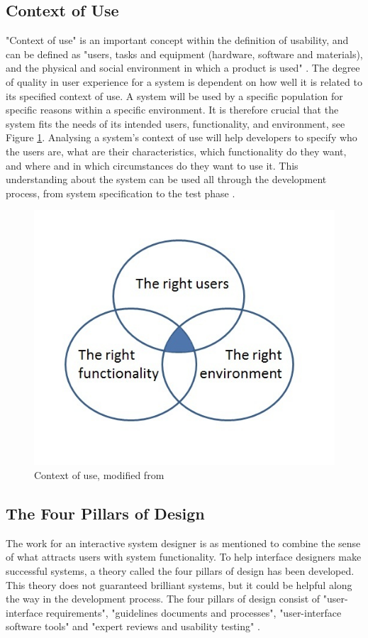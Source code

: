 \subsection{Context of Use}
"Context of use" is an important concept within the definition of usability, and can be defined as "users, tasks and equipment (hardware, software and materials), and the physical and social environment in which a product is used" \cite{maguire2001context}. The degree of quality in user experience for a system is dependent on how well it is related to its specified context of use. A system will be used by a specific population for specific reasons within a specific environment. It is therefore crucial that the system fits the needs of its intended users, functionality, and environment, see Figure \ref{contextofuse}. Analysing a system's context of use will help developers to specify who the users are, what are their characteristics, which functionality do they want, and where and in which circumstances do they want to use it. This understanding about the system can be used all through the development process, from system specification to the test phase \cite{maguire2001context}.

\begin{figure} [ht!]
\centering
\includegraphics[scale=0.8]{contextOfUse.jpg}
\caption[Context of use]{Context of use, modified from \cite{contextofusefigure}}
\label{contextofuse}
\end{figure}  
  
\subsection{The Four Pillars of Design}
The work for an interactive system designer is as mentioned to combine the sense of what attracts users with system functionality. To help interface designers make successful systems, a theory called the four pillars of design has been developed. This theory does not guaranteed brilliant systems, but it could be helpful along the way in the development process. The four pillars of design consist of "user-interface requirements", "guidelines documents and processes", "user-interface software tools" and "expert reviews and usability testing" \cite{mmi}.    

